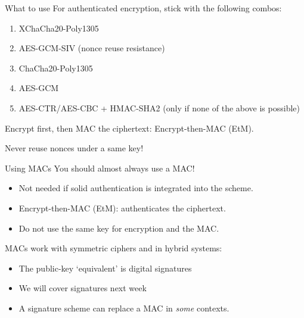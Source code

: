 \begin{frame}{What to use}
  For authenticated encryption, stick with the following combos:
  \begin{enumerate}[<+(1)->]
    \item XChaCha20-Poly1305
    \item AES-GCM-SIV (nonce reuse resistance)
    \item ChaCha20-Poly1305
    \item AES-GCM
    \item AES-CTR/AES-CBC + HMAC-SHA2 (only if none of the above is possible)
  \end{enumerate}

  \vspace*{1em}

  \pause
  Encrypt first, then MAC the ciphertext: Encrypt-then-MAC (EtM).

  \vspace*{1em}

  \pause
  Never reuse nonces under a same key!
\end{frame}

\begin{frame}{Using MACs}
  You should almost always use a MAC!
  \begin{itemize}[<+(1)->]
    \item Not needed if solid authentication is integrated into the scheme.
    \item Encrypt-then-MAC (EtM): authenticates the ciphertext.
    \item Do not use the same key for encryption and the MAC.
  \end{itemize}

  \vspace*{1em}

  \pause
  MACs work with symmetric ciphers and in hybrid systems:
  \begin{itemize}[<+(1)->]
    \item The public-key `equivalent' is digital signatures
    \item We will cover signatures next week
    \item A signature scheme can replace a MAC in \emph{some} contexts.
  \end{itemize}
\end{frame}


